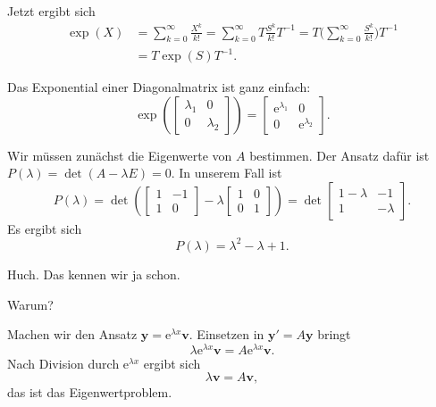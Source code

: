 \documentclass[9pt]{beamer}
\newcommand{\ee}{\mathrm e}
\begin{document}
\begin{frame}
Jetzt ergibt sich
\[\begin{split}\exp(X) &= \sum_{k=0}^\infty \frac{X^k}{k!}
= \sum_{k=0}^\infty T\frac{S^k}{k!}T^{-1}
= T\Bigg(\sum_{k=0}^\infty \frac{S^k}{k!}\Bigg)T^{-1}\\
&= T\exp(S)T^{-1}.
\end{split}\]
\end{frame}

\begin{frame}
Das Exponential einer Diagonalmatrix ist ganz einfach:
\[\exp(\begin{bmatrix}
\lambda_1 & 0\\
0 & \lambda_2
\end{bmatrix})
= \begin{bmatrix}
\ee^{\lambda_1} & 0\\
0 & \ee^{\lambda_2}
\end{bmatrix}.\]
\end{frame}

\begin{frame}
Wir müssen zunächst die Eigenwerte von $A$ bestimmen.
Der Ansatz dafür ist $P(\lambda)=\det(A-\lambda E)=0$. In unserem
Fall ist
\[P(\lambda) = \det(
\begin{bmatrix}
1 & -1\\
1 & 0
\end{bmatrix}-\lambda\begin{bmatrix}
1 & 0\\
0 & 1
\end{bmatrix})
= \det\begin{bmatrix}
1-\lambda & -1\\
1 & -\lambda
\end{bmatrix}.\]
Es ergibt sich
\[P(\lambda) = \lambda^2-\lambda+1.\]
\end{frame}

\begin{frame}
Huch. Das kennen wir ja schon.
\end{frame}

\begin{frame}
Warum?
\end{frame}

\begin{frame}
Machen wir den Ansatz $\mathbf y = \ee^{\lambda x}\mathbf v$.
Einsetzen in $\mathbf y'=A\mathbf y$ bringt
\[\lambda\ee^{\lambda x}\mathbf v = A\ee^{\lambda x}\mathbf v.\]
Nach Division durch $\ee^{\lambda x}$ ergibt sich
\[\lambda\mathbf v = A\mathbf v,\]
das ist das Eigenwertproblem.
\end{frame}
\end{document}
